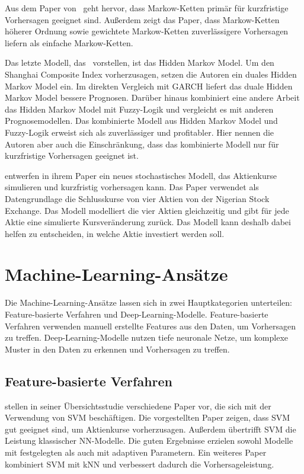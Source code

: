 Aus dem Paper von~\textcite{sasikumar2015applications} geht hervor, dass Markow-Ketten primär für kurzfristige Vorhersagen geeignet sind. Außerdem zeigt das Paper, dass Markow-Ketten höherer Ordnung sowie gewichtete Markow-Ketten zuverlässigere Vorhersagen liefern als einfache Markow-Ketten.

Das letzte Modell, das~\textcite{sasikumar2015applications} vorstellen, ist das Hidden Markov Model. Um den Shanghai Composite Index vorherzusagen, setzen die Autoren ein duales Hidden Markov Model ein. Im direkten Vergleich mit \ac{GARCH} liefert das duale Hidden Markov Model bessere Prognosen. Darüber hinaus kombiniert eine andere Arbeit das Hidden Markov Model mit Fuzzy-Logik und vergleicht es mit anderen Prognosemodellen. Das kombinierte Modell aus Hidden Markov Model und Fuzzy-Logik erweist sich als zuverlässiger und profitabler. Hier nennen die Autoren aber auch die Einschränkung, dass das kombinierte Modell nur für kurzfristige Vorhersagen geeignet ist.

\textcite{Ofomataetal2017} entwerfen in ihrem Paper ein neues stochastisches Modell, das Aktienkurse simulieren und kurzfristig vorhersagen kann. Das Paper verwendet als Datengrundlage die Schlusskurse von vier Aktien von der Nigerian Stock Exchange. Das Modell modelliert die vier Aktien gleichzeitig und gibt für jede Aktie eine simulierte Kursveränderung zurück. Das Modell kann deshalb dabei helfen zu entscheiden, in welche Aktie investiert werden soll.
\section{Machine-Learning-Ansätze}\label{sec:machine_learning}
Die Machine-Learning-Ansätze lassen sich in zwei Hauptkategorien unterteilen: Feature-basierte Verfahren und Deep-Learning-Modelle. Feature-basierte Verfahren verwenden manuell erstellte Features aus den Daten, um Vorhersagen zu treffen. Deep-Learning-Modelle nutzen tiefe neuronale Netze, um komplexe Muster in den Daten zu erkennen und Vorhersagen zu treffen.
\subsection{Feature-basierte Verfahren}\label{subsec:feature_basierte_verfahren}
\textcite{rundo2019machine} stellen in seiner Übersichtsstudie verschiedene Paper vor, die sich mit der Verwendung von \ac{SVM} beschäftigen. Die vorgestellten Paper zeigen, dass \ac{SVM} gut geeignet sind, um Aktienkurse vorherzusagen. Außerdem übertrifft \ac{SVM} die Leistung klassischer \ac{NN}-Modelle. Die guten Ergebnisse erzielen sowohl Modelle mit festgelegten als auch mit adaptiven Parametern. Ein weiteres Paper kombiniert \ac{SVM} mit \ac{kNN} und verbessert dadurch die Vorhersageleistung.

